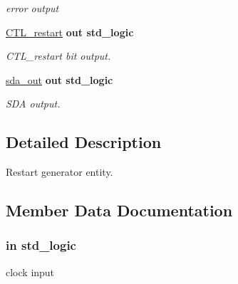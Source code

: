 \begin{DoxyCompactItemize}
\begin{DoxyCompactList}\small\item\em error output \end{DoxyCompactList}\item 
\hyperlink{classrestart__generator_ad46a8571b2d0b711e13f7f42bab5f536}{C\+T\+L\+\_\+restart}  {\bfseries {\bfseries \textcolor{vhdlchar}{out}\textcolor{vhdlchar}{ }}} {\bfseries \textcolor{vhdlchar}{std\+\_\+logic}\textcolor{vhdlchar}{ }} 
\begin{DoxyCompactList}\small\item\em C\+T\+L\+\_\+restart bit output. \end{DoxyCompactList}\item 
\hyperlink{classrestart__generator_a225745186aee8a36d9f0f5a266e3ea6e}{sda\+\_\+out}  {\bfseries {\bfseries \textcolor{vhdlchar}{out}\textcolor{vhdlchar}{ }}} {\bfseries \textcolor{vhdlchar}{std\+\_\+logic}\textcolor{vhdlchar}{ }} 
\begin{DoxyCompactList}\small\item\em S\+DA output. \end{DoxyCompactList}\end{DoxyCompactItemize}


\subsection{Detailed Description}
Restart generator entity. 

\subsection{Member Data Documentation}
\subsubsection[{\texorpdfstring{clk}{clk}}]{ {\bfseries \textcolor{vhdlchar}{in}\textcolor{vhdlchar}{ }} {\bfseries \textcolor{vhdlchar}{std\+\_\+logic}\textcolor{vhdlchar}{ }} \hspace{0.3cm}{\ttfamily [Port]}}\hypertarget{classrestart__generator_a4a4609c199d30b3adebbeb3a01276ec5}{}\label{classrestart__generator_a4a4609c199d30b3adebbeb3a01276ec5}


clock input 

